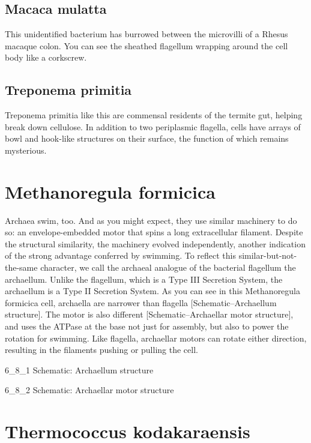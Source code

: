 \documentclass[]{tufte-book}
\begin{document}
\subsection{Macaca mulatta}\label{Bacterial_invasion}

This unidentified bacterium has burrowed between the microvilli of a
Rhesus macaque colon. You can see the sheathed flagellum wrapping around
the cell body like a corkscrew.

\subsection{Treponema primitia}\label{Treponema_primitia}

Treponema primitia like this are commensal residents of the termite gut,
helping break down cellulose. In addition to two periplasmic flagella,
cells have arrays of bowl and hook-like structures on their surface, the
function of which remains mysterious.

\section{Methanoregula formicica}\label{methanoregula-formicica}

Archaea swim, too. And as you might expect, they use similar machinery
to do so: an envelope-embedded motor that spins a long extracellular
filament. Despite the structural similarity, the machinery evolved
independently, another indication of the strong advantage conferred by
swimming. To reflect this similar-but-not-the-same character, we call
the archaeal analogue of the bacterial flagellum the archaellum. Unlike
the flagellum, which is a Type III Secretion System, the archaellum is a
Type II Secretion System. As you can see in this Methanoregula formicica
cell, archaella are narrower than flagella {[}Schematic--Archaellum
structure{]}. The motor is also different {[}Schematic--Archaellar motor
structure{]}, and uses the ATPase at the base not just for assembly, but
also to power the rotation for swimming. Like flagella, archaellar
motors can rotate either direction, resulting in the filaments pushing
or pulling the cell.

6\_8\_1 Schematic: Archaellum structure

6\_8\_2 Schematic: Archaellar motor structure

\section{Thermococcus kodakaraensis}\label{thermococcus-kodakaraensis}
\end{document}
